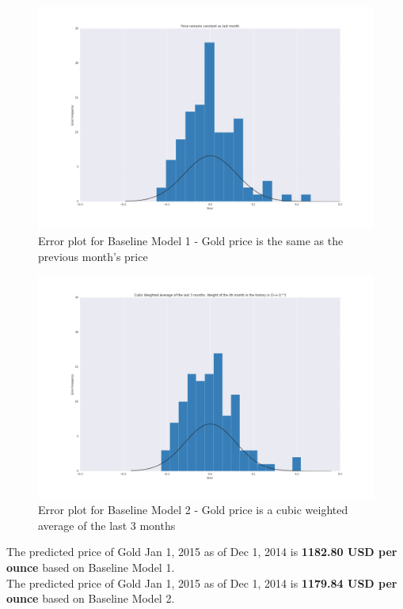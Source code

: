 \documentclass[runningheads]{llncs}
\begin{document}
\begin{figure}
\centering
\includegraphics[width=\textwidth]{BM1_Gold.png}
\caption{Error plot for Baseline Model 1 - Gold price is the same as the previous month's price}
\label{fig:BM1_Gold.png}
\end{figure}

\begin{figure}
\centering
\includegraphics[width=\textwidth]{BM2_Gold.png}
\caption{Error plot for Baseline Model 2 - Gold price is a cubic weighted average of the last 3 months}
\label{fig:BM2_Gold.png}
\end{figure}

\noindent The predicted price of Gold Jan 1, 2015 as of Dec 1, 2014 is 
\textbf{1182.80 USD per ounce} based on Baseline Model 1.\\

\noindent The predicted price of Gold Jan 1, 2015 as of Dec 1, 2014 is 
\textbf{1179.84 USD per ounce} based on Baseline Model 2.\\
\end{document}
